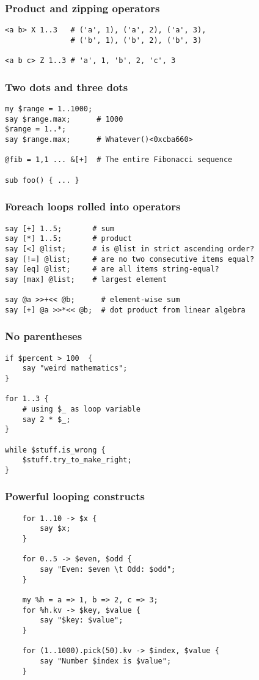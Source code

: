 \documentclass{beamer}
\begin{document}
\begin{frame}[fragile]
\frametitle{Product and zipping operators}
\begin{verbatim}
<a b> X 1..3   # ('a', 1), ('a', 2), ('a', 3),
               # ('b', 1), ('b', 2), ('b', 3)

<a b c> Z 1..3 # 'a', 1, 'b', 2, 'c', 3
\end{verbatim}
\end{frame}

\begin{frame}[fragile]
\frametitle{Two dots and three dots}
\begin{verbatim}
my $range = 1..1000;
say $range.max;      # 1000
$range = 1..*;
say $range.max;      # Whatever()<0xcba660>

@fib = 1,1 ... &[+]  # The entire Fibonacci sequence

sub foo() { ... }
\end{verbatim}
\end{frame}

\begin{frame}[fragile]
\frametitle{Foreach loops rolled into operators}
\begin{verbatim}
say [+] 1..5;       # sum
say [*] 1..5;       # product
say [<] @list;      # is @list in strict ascending order?
say [!=] @list;     # are no two consecutive items equal?
say [eq] @list;     # are all items string-equal?
say [max] @list;    # largest element

say @a >>+<< @b;      # element-wise sum
say [+] @a >>*<< @b;  # dot product from linear algebra
\end{verbatim}
\end{frame}

\begin{frame}[fragile]
\frametitle{No parentheses}
\begin{verbatim}
if $percent > 100  {
    say "weird mathematics";
}

for 1..3 {
    # using $_ as loop variable
    say 2 * $_;
}

while $stuff.is_wrong {
    $stuff.try_to_make_right;
}
\end{verbatim}
\end{frame}

\begin{frame}[fragile]
\frametitle{Powerful looping constructs}
\begin{verbatim}
    for 1..10 -> $x {
        say $x;
    }

    for 0..5 -> $even, $odd {
        say "Even: $even \t Odd: $odd";
    }

    my %h = a => 1, b => 2, c => 3;
    for %h.kv -> $key, $value {
        say "$key: $value";
    }

    for (1..1000).pick(50).kv -> $index, $value {
        say "Number $index is $value";
    }
\end{verbatim}
\end{frame}
\end{document}
